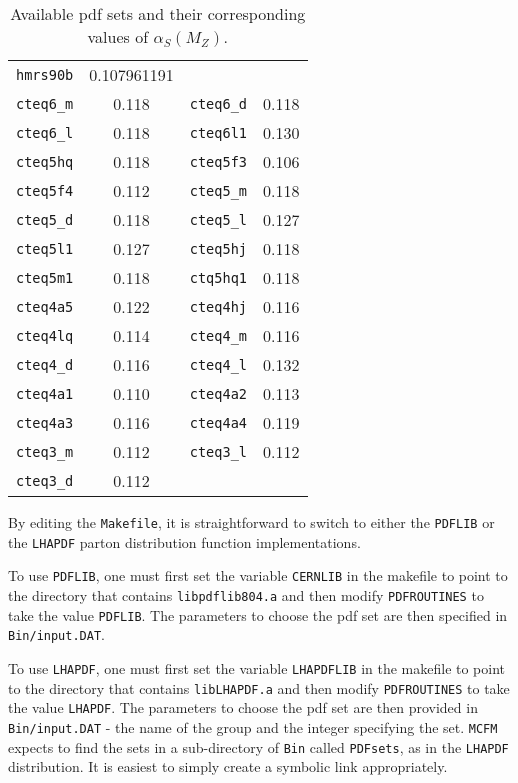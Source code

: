 \documentclass[12pt]{article}
\begin{document}
\begin{table}[h]
\begin{center}
\begin{tabular}{|c|c||c|c|}
{\tt hmrs90b}  &  0.107961191 \\
{\tt cteq6\_m} &  0.118       &
{\tt cteq6\_d} &  0.118       \\
{\tt cteq6\_l} &  0.118       &
{\tt cteq6l1}  &  0.130       \\
{\tt cteq5hq}  &  0.118       &
{\tt cteq5f3}  &  0.106       \\
{\tt cteq5f4}  &  0.112       &
{\tt cteq5\_m} &  0.118       \\
{\tt cteq5\_d} &  0.118       & 
{\tt cteq5\_l} &  0.127       \\ 
{\tt cteq5l1}  &  0.127       & 
{\tt cteq5hj}  &  0.118       \\
{\tt cteq5m1}  &  0.118       &
{\tt ctq5hq1}  &  0.118       \\
{\tt cteq4a5}  &  0.122       &
{\tt cteq4hj}  &  0.116       \\
{\tt cteq4lq}  &  0.114       &
{\tt cteq4\_m} &  0.116       \\
{\tt cteq4\_d} &  0.116       &
{\tt cteq4\_l} &  0.132       \\
{\tt cteq4a1}  &  0.110       &
{\tt cteq4a2}  &  0.113       \\
{\tt cteq4a3}  &  0.116       &
{\tt cteq4a4}  &  0.119       \\
{\tt cteq3\_m}  &  0.112       &
{\tt cteq3\_l}  &  0.112       \\
{\tt cteq3\_d}  &  0.112       & \\
\hline
\end{tabular}
\end{center}
\caption{Available pdf sets and their corresponding values of
$\alpha_S(M_Z)$.}
\label{pdlabel}
\end{table}

By editing the {\tt Makefile}, it is straightforward to switch to
either the {\tt PDFLIB} or the {\tt LHAPDF} parton distribution
function implementations.

To use {\tt PDFLIB}, one must first set the variable {\tt CERNLIB}
in the makefile to point to the directory that contains
{\tt libpdflib804.a} and then modify {\tt PDFROUTINES} to
take the value {\tt PDFLIB}. The parameters to choose the
pdf set are then specified in {\tt Bin/input.DAT}.

To use {\tt LHAPDF}, one must first set the variable {\tt LHAPDFLIB}
in the makefile to point to the directory that contains
{\tt libLHAPDF.a} and then modify {\tt PDFROUTINES} to
take the value {\tt LHAPDF}. The parameters to choose the
pdf set are then provided in {\tt Bin/input.DAT} - 
the name of the group and the integer specifying 
the set.
{\tt MCFM} expects to find the sets in a sub-directory of {\tt Bin} called
{\tt PDFsets}, as in the {\tt LHAPDF} distribution. It is easiest to
simply create a symbolic link appropriately.
\end{document}
